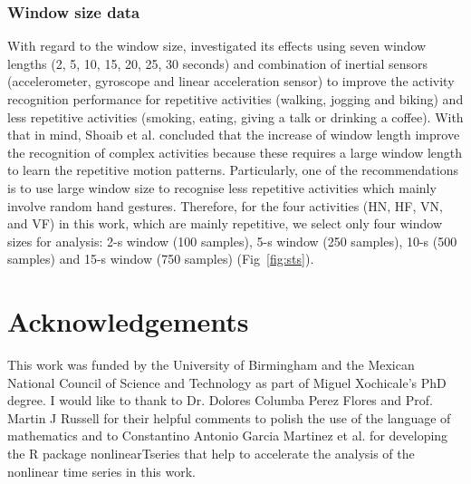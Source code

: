 \documentclass[fleqn,10pt]{wlscirep}
\begin{document}
\subsubsection*{Window size data}
With regard to the window size, \cite{shoaib2016} investigated its effects 
using seven window lengths (2, 5, 10, 15, 20, 25, 30 seconds)
and combination of inertial sensors (accelerometer, gyroscope and linear 
acceleration sensor) to improve the activity recognition performance for 
repetitive activities (walking, jogging and biking) and less repetitive 
activities (smoking, eating, giving a talk or drinking a coffee).
With that in mind, Shoaib et al. \cite{shoaib2016} concluded that the 
increase of window length improve the recognition of complex activities 
because these requires a large window length to learn the repetitive 
motion patterns. Particularly, one of the recommendations is to use large 
window size to recognise less repetitive activities which mainly involve 
random hand gestures. Therefore, for the four activities 
(HN, HF, VN, and VF) in this work, which are mainly repetitive, 
we select only four window sizes for analysis: 2-s window (100 samples), 
5-s window (250 samples), 10-s (500 samples) and 15-s window (750 samples) 
(Fig~\ref{fig:sts}).









%
%



\section*{Acknowledgements}

This work was funded by the University of Birmingham and the 
Mexican National Council of Science and Technology as part of 
Miguel Xochicale's PhD degree. I would like to thank to Dr. Dolores 
Columba Perez Flores and Prof. Martin J Russell for their helpful 
comments to polish the use of the language of mathematics and to 
Constantino Antonio Garcia Martinez et al. for developing the R 
package nonlinearTseries that help to accelerate the 
analysis of the nonlinear time series in this work.
\end{document}
